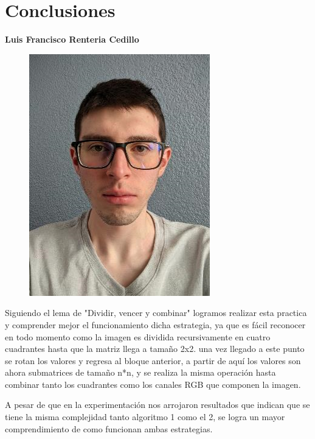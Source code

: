 \documentclass[12pt,twoside]{article}
\begin{document}
    \section{Conclusiones}
    \textbf{\large Luis Francisco Renteria Cedillo}
    \begin{figure}[H]
        \centering
        \includegraphics[angle=0, scale=0.5]{imagenes/foto1.png}
    \end{figure}
     Siguiendo el lema de "Dividir, vencer y combinar" logramos realizar esta practica y comprender mejor el funcionamiento dicha estrategia, ya que es fácil reconocer en todo momento como la imagen es dividida recursivamente en cuatro cuadrantes hasta que la matriz llega a tamaño 2x2. una vez llegado a este punto se rotan los valores y regresa al bloque anterior, a partir de aquí los valores son ahora submatrices de tamaño n*n, y se realiza la misma operación hasta combinar tanto los cuadrantes como los canales RGB que componen la imagen.
        
    A pesar de que en la experimentación nos arrojaron resultados que indican que se tiene la misma complejidad tanto algoritmo 1 como el 2, se logra un mayor comprendimiento de como funcionan ambas estrategias.
    
\end{document}
